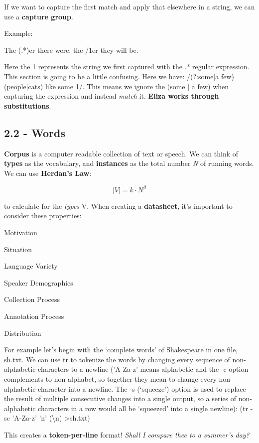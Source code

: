 \documentclass{article}
\begin{document}
If we want to capture the first match and apply that elsewhere in a string, we can
use a \textbf{capture group}.

Example:

The (.*)er there were, the /1er they will be.

Here the 1 represents the string we first captured with the .* regular expression. This section is
going to be a little confusing. Here we have: /(?:some|a few) (people|cats) like some 1/. This means we ignore the (some | a few)
when capturing the expression and instead \textit{match} it. \textbf{Eliza works through substitutions}.

\subsection{2.2 - Words}

\textbf{Corpus} is a computer readable collection of text or speech. We can think of \textbf{types} as the vocabulary, and \textbf{instances} as the total number \textit{N} of running words.
We can use \textbf{Herdan's Law}:

\[
    \mid V \mid = k \cdot N^\beta
\]

to calculate for the \textit{types} V. When creating a \textbf{datasheet}, it's important to consider these properties:

\itemize
\item Motivation
\item Situation
\item Language Variety
\item Speaker Demographics
\item Collection Process
\item Annotation Process
\item Distribution


For example let’s begin with the ‘complete words’ of Shakespeare in one file,
sh.txt. We can use tr to tokenize the words by changing every sequence of non-
alphabetic characters to a newline (’A-Za-z’ means alphabetic and the -c option
complements to non-alphabet, so together they mean to change every non-alphabetic
character into a newline. The -s (‘squeeze’) option is used to replace the result
of multiple consecutive changes into a single output, so a series of non-alphabetic
characters in a row would all be ‘squeezed’ into a single newline):
(tr -sc 'A-Za-z' 'n' (\textbackslash n) \textgreater  sh.txt) \newline

This creates a \textbf{token-per-line} format! \newline
\newline \textit{Shall I compare thee to a summer’s day?}
\end{document}
